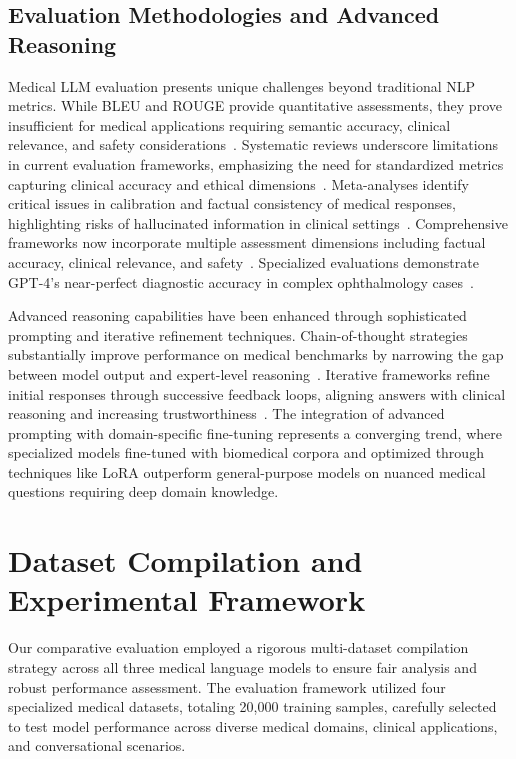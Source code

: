 \documentclass[conference]{IEEEtran}
\begin{document}
\subsection{Evaluation Methodologies and Advanced Reasoning}

Medical LLM evaluation presents unique challenges beyond traditional NLP metrics. While BLEU and ROUGE provide quantitative assessments, they prove insufficient for medical applications requiring semantic accuracy, clinical relevance, and safety considerations~\cite{gupta2024llm,manish2024evaluation,ebrahimi2024foundation}. Systematic reviews underscore limitations in current evaluation frameworks, emphasizing the need for standardized metrics capturing clinical accuracy and ethical dimensions~\cite{shool2025systematic}. Meta-analyses identify critical issues in calibration and factual consistency of medical responses, highlighting risks of hallucinated information in clinical settings~\cite{wei2024evaluation}. Comprehensive frameworks now incorporate multiple assessment dimensions including factual accuracy, clinical relevance, and safety~\cite{awasthi2024quest}. Specialized evaluations demonstrate GPT-4's near-perfect diagnostic accuracy in complex ophthalmology cases~\cite{milad2024assessing}.

Advanced reasoning capabilities have been enhanced through sophisticated prompting and iterative refinement techniques. Chain-of-thought strategies substantially improve performance on medical benchmarks by narrowing the gap between model output and expert-level reasoning~\cite{lievin2024can}. Iterative frameworks refine initial responses through successive feedback loops, aligning answers with clinical reasoning and increasing trustworthiness~\cite{lucas2024reasoning}. The integration of advanced prompting with domain-specific fine-tuning represents a converging trend, where specialized models fine-tuned with biomedical corpora and optimized through techniques like LoRA outperform general-purpose models on nuanced medical questions requiring deep domain knowledge.

\section{Dataset Compilation and Experimental Framework}

Our comparative evaluation employed a rigorous multi-dataset compilation strategy across all three medical language models to ensure fair analysis and robust performance assessment. The evaluation framework utilized four specialized medical datasets, totaling 20,000 training samples, carefully selected to test model performance across diverse medical domains, clinical applications, and conversational scenarios.
\end{document}
